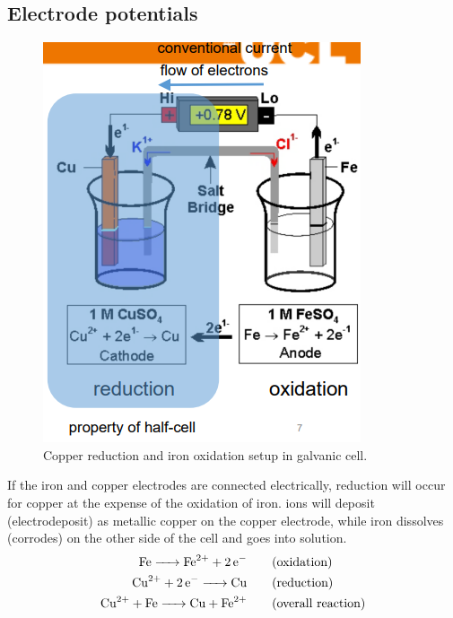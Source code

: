 \subsection{Electrode potentials}
\begin{figure}[H]
    \centering
    \includegraphics[width = 0.5 \textwidth]{img/figure71.png}
    \caption{Copper reduction and iron oxidation setup in galvanic cell.}
    \label{copperRedIronOx}
\end{figure}
If the iron and copper electrodes are connected electrically, reduction will occur for copper at the expense of the oxidation of iron.  ions will deposit (electrodeposit) as metallic copper on the copper electrode, while iron dissolves (corrodes) on the other side of the cell and goes into solution.
\begin{align}
    \ce{Fe -> Fe^2+ + 2e^-} \qquad       & \textrm{(oxidation)}        \\
    \ce{Cu^2+ + 2e^- -> Cu} \qquad       & \textrm{(reduction)}        \\
    \ce{Cu^2+ + Fe -> Cu + Fe^2+} \qquad & \textrm{(overall reaction)}
\end{align}
